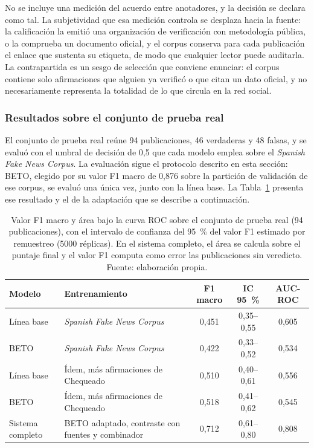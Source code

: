 No se incluye una medición del acuerdo entre anotadores, y la decisión se declara como tal. La subjetividad que esa medición controla se desplaza hacia la fuente: la calificación la emitió una organización de verificación con metodología pública, o la comprueba un documento oficial, y el corpus conserva para cada publicación el enlace que sustenta su etiqueta, de modo que cualquier lector puede auditarla. La contrapartida es un sesgo de selección que conviene enunciar: el corpus contiene solo afirmaciones que alguien ya verificó o que citan un dato oficial, y no necesariamente representa la totalidad de lo que circula en la red social.

\subsubsection{Resultados sobre el conjunto de prueba real}
\label{sec:resultados-argentino}

El conjunto de prueba real reúne 94 publicaciones, 46 verdaderas y 48 falsas, y se evaluó con el umbral de decisión de 0,5 que cada modelo emplea sobre el \textit{Spanish Fake News Corpus}. La evaluación sigue el protocolo descrito en esta sección: BETO, elegido por su valor F1 macro de 0,876 sobre la partición de validación de ese corpus, se evaluó una única vez, junto con la línea base. La Tabla~\ref{tab:resultados-argentino} presenta ese resultado y el de la adaptación que se describe a continuación.

\begin{table}[t]
  \centering
  \small
  \caption{Valor F1 macro y área bajo la curva ROC sobre el conjunto de prueba real (94 publicaciones), con el intervalo de confianza del 95~\% del valor F1 estimado por remuestreo (5000 réplicas). En el sistema completo, el área se calcula sobre el puntaje final y el valor F1 computa como error las publicaciones sin veredicto. Fuente: elaboración propia.}
  \label{tab:resultados-argentino}
  \begin{tabular}{@{}l >{\raggedright\arraybackslash}p{5.4cm} c c c@{}}
    \hline
    \textbf{Modelo} & \textbf{Entrenamiento} & \textbf{F1 macro} & \textbf{IC 95~\%} & \textbf{AUC-ROC} \\
    \hline
    Línea base & \textit{Spanish Fake News Corpus} & 0,451 & 0,35--0,55 & 0,605 \\
    BETO & \textit{Spanish Fake News Corpus} & 0,422 & 0,33--0,52 & 0,534 \\
    \hline
    Línea base & Ídem, más afirmaciones de Chequeado & 0,510 & 0,40--0,61 & 0,556 \\
    BETO & Ídem, más afirmaciones de Chequeado & 0,518 & 0,41--0,62 & 0,545 \\
    \hline
    Sistema completo & BETO adaptado, contraste con fuentes y combinador & 0,712 & 0,61--0,80 & 0,808 \\
    \hline
  \end{tabular}
\end{table}

